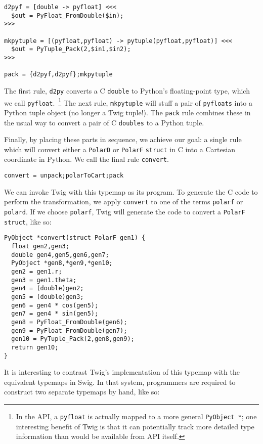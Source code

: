 \begin{verbatim}
d2pyf = [double -> pyfloat] <<<
  $out = PyFloat_FromDouble($in);
>>>

mkpytuple = [(pyfloat,pyfloat) -> pytuple(pyfloat,pyfloat)] <<<
  $out = PyTuple_Pack(2,$in1,$in2);
>>>

pack = {d2pyf,d2pyf};mkpytuple
\end{verbatim}

The first rule, \texttt{d2py} converts a C \texttt{double} to Python's floating-point type, which we call \texttt{pyfloat}.~\footnote{In the API, a \texttt{pyfloat} is actually mapped to a more general \texttt{PyObject *}; one interesting benefit of Twig is that it can potentially track more detailed type information than would be available from API itself.} The next rule, \texttt{mkpytuple} will stuff a pair of \texttt{pyfloats} into a Python tuple object (no longer a Twig tuple!). The \texttt{pack} rule combines these in the usual way to convert a pair of C \texttt{doubles} to a Python tuple.

Finally, by placing these parts in sequence, we achieve our goal: a single rule which will convert either a \texttt{PolarD} or \texttt{PolarF} \texttt{struct} in C into a Cartesian coordinate  in Python. We call the final rule \texttt{convert}.

\begin{verbatim}
convert = unpack;polarToCart;pack
\end{verbatim}

We can invoke Twig with this typemap as its program. To generate the C code to perform the transformation, we apply \texttt{convert} to one of the terms \texttt{polarf} or \texttt{polard}. If we choose \texttt{polarf}, Twig will generate the code to convert a \texttt{PolarF} \texttt{struct}, like so:

\begin{verbatim}
PyObject *convert(struct PolarF gen1) {
  float gen2,gen3;
  double gen4,gen5,gen6,gen7;
  PyObject *gen8,*gen9,*gen10;
  gen2 = gen1.r;
  gen3 = gen1.theta;
  gen4 = (double)gen2;
  gen5 = (double)gen3;
  gen6 = gen4 * cos(gen5);  
  gen7 = gen4 * sin(gen5);
  gen8 = PyFloat_FromDouble(gen6);
  gen9 = PyFloat_FromDouble(gen7);
  gen10 = PyTuple_Pack(2,gen8,gen9);
  return gen10;
}
\end{verbatim}

It is interesting to contrast Twig's implementation of this typemap with the equivalent typemaps in Swig. In that system, programmers are required to construct two separate typemaps by hand, like so:

